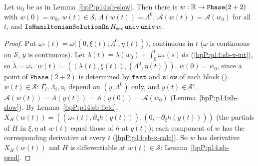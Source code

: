 \begin{proposition}\label{bpP:p14:sb-global}
Let $w_0$ be as in Lemma~\ref{bpP:p14:sb-slow}. Then there is $w:\mathbb{R}\to\texttt{Phase}(2+2)$ with $w(0)=w_0$, $w(t)\in\mathcal S$, $\Lambda(w(t))=\Lambda^0$, $\mathcal A(w(t))=\mathcal A(w_0)$ for all $t$, and $\texttt{IsHamiltonianSolutionOn}\,H_{\rm sec}\,\texttt{univ}\,\texttt{univ}\,w$.
\end{proposition}
\begin{proof}
\label{stepP:p14:sb-gl-1} Put $\omega_*(t)=\omega\bigl((0,\xi(t);\Lambda^0,\eta(t))\bigr)$, continuous in $t$ ($\omega$ is continuous on $\mathcal S$, $y$ is continuous). Let $\lambda(t)=\lambda(w_0)+\int_0^t\omega_*(s)\,ds$ (\ref{bpP:p14:sb-x-int}), so $\dot\lambda=\omega_*$.
\label{stepP:p14:sb-gl-2} $w(t)=((\lambda(t),\xi(t)),(\Lambda^0,\eta(t)))$. $w(0)=w_0$, since a point of $\texttt{Phase}(2+2)$ is determined by $\texttt{fast}$ and $\texttt{slow}$ of each block (). $w(t)\in\mathcal S$: $\Gamma_i,\Lambda_i,a_i$ depend on $(y,\Lambda^0)$ only, and $y(t)\in\mathcal S'$. $\mathcal A(w(t))=A(y(t))=A(y(0))=\mathcal A(w_0)$ (Lemma~\ref{bpP:p14:sb-slow}).
\label{stepP:p14:sb-gl-3} By Lemma~\ref{bpP:p14:sb-field}, $X_H(w(t))=((\omega_*(t),\partial_\eta h(y(t))),(0,-\partial_\xi h(y(t))))$ (the partials of $H$ in $\xi,\eta$ at $w(t)$ equal those of $h$ at $y(t)$); each component of $w$ has the corresponding derivative at every $t$ (\ref{bpP:p14:sb-x-calc}). So $w$ has derivative $X_H(w(t))$ and $H$ is differentiable at $w(t)\in\mathcal S$: Lemma~\ref{bpP:p14:sb-pred}.
\end{proof}

